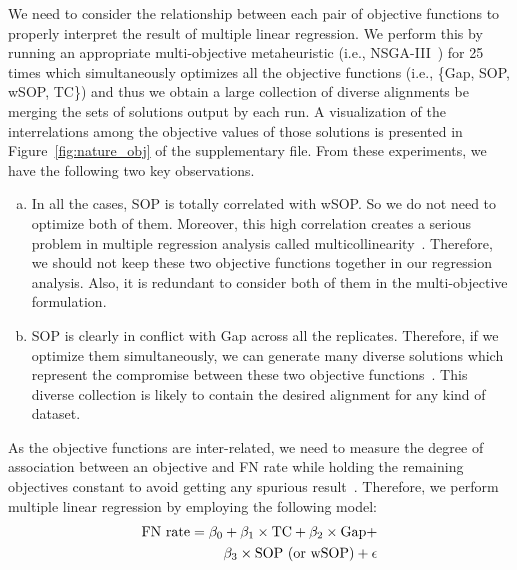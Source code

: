 We need to consider the relationship between each pair of objective functions to properly interpret the result of multiple linear regression. We perform this by running an appropriate multi-objective metaheuristic (i.e., NSGA-III~\citep{deb2014evolutionary}) for 25 times which simultaneously optimizes all the objective functions (i.e., \{Gap, SOP, wSOP, TC\}) and thus we obtain a large collection of diverse alignments be merging the sets of solutions output by each run. 
A visualization of the interrelations among the objective values of those solutions is presented in Figure~\ref{fig:nature_obj} of the supplementary file. From these experiments, we have the following two key observations.
\begin{enumerate}[(a)]
	
	\item In all the cases, SOP is totally correlated with wSOP. So we do not need to optimize both of them. Moreover, this high correlation creates a serious problem in multiple regression analysis called multicollinearity~\citep{montgomery2012introduction}. Therefore, we should not keep these two objective functions together in our regression analysis. Also, it is redundant to consider both of them in the multi-objective formulation. 
	
	\item SOP is clearly in conflict with Gap across all the replicates. Therefore, if we optimize them simultaneously, we can generate many diverse solutions which represent the compromise between these two objective functions~\citep{kalyanmoy2001multi}. This diverse collection is likely to contain the desired alignment for any kind of dataset.
	
\end{enumerate}

As the objective functions are inter-related, we need to measure the degree of association between an objective and FN rate while holding the remaining objectives constant to avoid getting any spurious result~\citep{montgomery2012introduction}. Therefore, we perform multiple linear regression by employing the following model:
\begin{equation}
\small
\begin{split}
\text{FN rate} = \beta_0 + \beta_1 \times \text{TC}+ \beta_2 \times \text{Gap} + \\
\beta_3 \times \text{SOP (or wSOP)} + \epsilon \label{eq:multi_lin_reg}
\end{split}
\end{equation}

